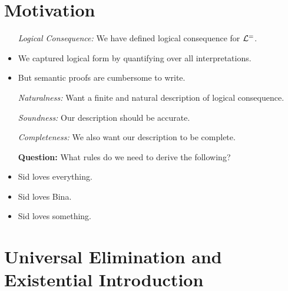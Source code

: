 \documentclass[a4paper, 11pt]{article} %
\begin{document}
\section*{Motivation}

\begin{itemize}
  \item[\it Logical Consequence:] We have defined logical consequence for $\mathcal{L}^=$.
    \item We captured logical form by quantifying over all interpretations.
    \item But semantic proofs are cumbersome to write.
  \item[\it Naturalness:] Want a finite and natural description of logical consequence.
  \item[\it Soundness:] Our description should be accurate.
  \item[\it Completeness:] We also want our description to be complete.
  \item[\bf Question:] What rules do we need to derive the following?
    \item Sid loves everything.
    \item Sid loves Bina.
    \item Sid loves something.
\end{itemize}






\section*{Universal Elimination and Existential Introduction}
\end{document}
